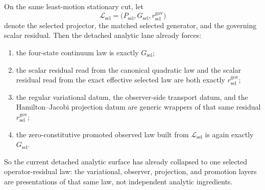 \begin{theorem}
\label{thm:the-detached-analytic-lane-already-collapses-to-one-selected-operator-residual-law}
On the same least-motion stationary cut, let
\[
\mathcal{L}_{\mathrm{sel}}=
\bigl(P_{\mathrm{sel}},G_{\mathrm{sel}},r^{\mathrm{gov}}_{\mathrm{sel}}\bigr)
\]
denote the selected projector, the matched selected generator, and the
governing scalar residual. Then the detached analytic lane already forces:
\begin{enumerate}
\item the four-state continuum law is exactly \(G_{\mathrm{sel}}\);
\item the scalar residual read from the canonical quadratic law and the scalar
      residual read from the exact effective selected law are both exactly
      \(r^{\mathrm{gov}}_{\mathrm{sel}}\);
\item the regular variational datum, the observer-side transport datum, and
      the Hamilton--Jacobi projection datum are generic wrappers of that same
      residual \(r^{\mathrm{gov}}_{\mathrm{sel}}\);
\item the zero-constitutive promoted observed law built from
      \(\mathcal{L}_{\mathrm{sel}}\) is again exactly \(G_{\mathrm{sel}}\).
\end{enumerate}
So the current detached analytic surface has already collapsed to one
selected operator-residual law: the variational, observer, projection, and
promotion layers are presentations of that same law, not independent analytic
ingredients.
\end{theorem}

